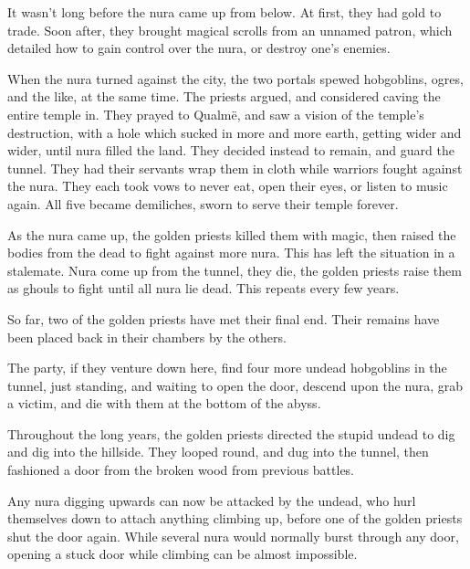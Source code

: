 \begin{multicols}{2}
\begin{exampletext}
It wasn't long before the nura came up from below.  At first, they had gold to trade.  Soon after, they brought magical scrolls from an unnamed patron, which detailed how to gain control over the nura, or destroy one's enemies.

When the nura turned against the city, the two portals spewed hobgoblins, ogres, and the like, at the same time.
The priests argued, and considered caving the entire temple in.
They prayed to Qualm\"{e}, and saw a vision of the temple's destruction, with a hole which sucked in more and more earth, getting wider and wider, until nura filled the land.
They decided instead to remain, and guard the tunnel.
They had their servants wrap them in cloth while warriors fought against the nura.
They each took vows to never eat, open their eyes, or listen to music again.
All five became demiliches, sworn to serve their temple forever.

As the nura came up, the golden priests killed them with magic, then raised the bodies from the dead to fight against more nura.
This has left the situation in a stalemate.
Nura come up from the tunnel, they die, the golden priests raise them as ghouls to fight until all nura lie dead.
This repeats every few years.

So far, two of the golden priests have met their final end.  Their remains have been placed back in their chambers by the others.

\end{exampletext}


The party, if they venture down here, find four more undead hobgoblins in the tunnel, just standing, and waiting to open the door, descend upon the nura, grab a victim, and die with them at the bottom of the abyss.

\begin{exampletext}

	Throughout the long years, the golden priests directed the stupid undead to dig and dig into the hillside.
	They looped round, and dug into the tunnel, then fashioned a door from the broken wood from previous battles.

Any nura digging upwards can now be attacked by the undead, who hurl themselves down to attach anything climbing up, before one of the golden priests shut the door again.
While several nura would normally burst through any door, opening a stuck door while climbing can be almost impossible.

\end{exampletext}

\end{multicols}

